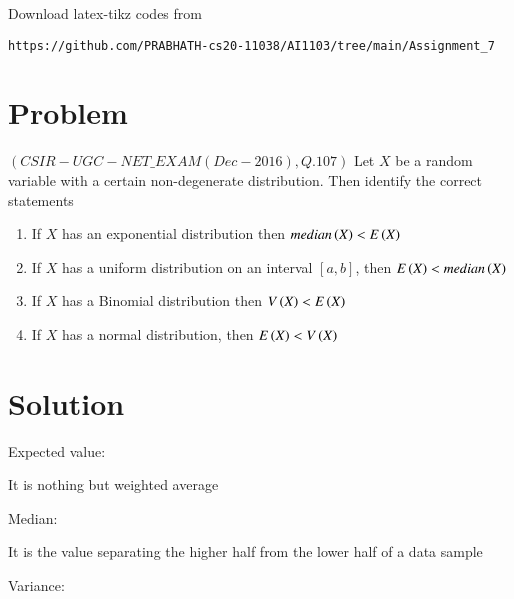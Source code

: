 \documentclass[journal,12pt,twocolumn]{IEEEtran}
\begin{document}
Download latex-tikz codes from
\begin{lstlisting}
https://github.com/PRABHATH-cs20-11038/AI1103/tree/main/Assignment_7
\end{lstlisting}

\section{Problem}

$(CSIR-UGC-NET\_EXAM (Dec-2016), Q.107)$ Let $X$ be a random variable with a certain non-degenerate distribution. Then identify the correct statements
\begin{enumerate}[1.]
    \item If $X$ has an exponential distribution then $median\left(X\right)<E\left(X\right)$
    \item If $X$ has a uniform distribution on an interval $[a,b]$, then $E\left(X\right)<median\left(X\right)$
    \item If $X$ has a Binomial distribution then $V\left(X\right)<E\left(X\right)$
    \item If $X$ has a normal distribution, then $E\left(X\right)<V\left(X\right)$
\end{enumerate}

\section{Solution}
Expected value:

It is nothing but weighted average

Median:

It is the value separating the higher half from the lower half of a data sample

Variance:
\end{document}

